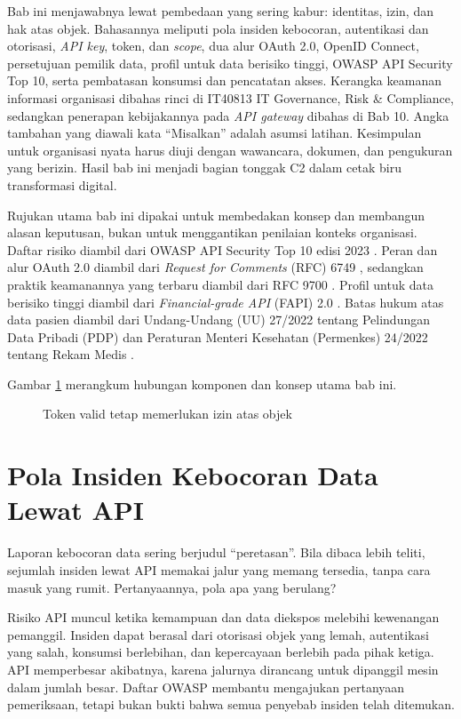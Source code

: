 Bab ini menjawabnya lewat pembedaan yang sering kabur: identitas, izin, dan hak atas objek. Bahasannya meliputi pola
insiden kebocoran, autentikasi dan otorisasi, \textit{API key}, token, dan \textit{scope}, dua alur OAuth 2.0,
OpenID Connect, persetujuan pemilik data, profil untuk data berisiko tinggi, OWASP API Security Top 10, serta
pembatasan konsumsi dan pencatatan akses. Kerangka keamanan informasi organisasi dibahas rinci di IT40813 IT
Governance, Risk \& Compliance, sedangkan penerapan kebijakannya pada \textit{API gateway} dibahas di Bab 10. Angka
tambahan yang diawali kata ``Misalkan'' adalah asumsi latihan. Kesimpulan untuk organisasi nyata harus diuji dengan
wawancara, dokumen, dan pengukuran yang berizin. Hasil bab ini menjadi bagian tonggak C2 dalam cetak biru
transformasi digital.

Rujukan utama bab ini dipakai untuk membedakan konsep dan membangun alasan keputusan, bukan untuk menggantikan
penilaian konteks organisasi. Daftar risiko diambil dari OWASP API Security Top 10 edisi 2023 \cite{owasp-api2023}.
Peran dan alur OAuth 2.0 diambil dari \textit{Request for Comments} (RFC) 6749 \cite{rfc6749}, sedangkan praktik
keamanannya yang terbaru diambil dari RFC 9700 \cite{rfc9700}. Profil untuk data berisiko tinggi diambil dari
\textit{Financial-grade API} (FAPI) 2.0 \cite{fapi2}. Batas hukum atas data pasien diambil dari Undang-Undang (UU)
27/2022 tentang Pelindungan Data Pribadi (PDP) \cite{uu27-2022-pdp} dan Peraturan Menteri Kesehatan (Permenkes)
24/2022 tentang Rekam Medis \cite{permenkes24-2022}.

Gambar \ref{fig:ch06-ilustrasi-bab} merangkum hubungan komponen dan konsep utama bab ini.
\begin{figure}[!htb]
  \centering
  
  \caption{Token valid tetap memerlukan izin atas objek}
  \label{fig:ch06-ilustrasi-bab}
\end{figure}

\section{Pola Insiden Kebocoran Data Lewat API}

Laporan kebocoran data sering berjudul ``peretasan''. Bila dibaca lebih teliti, sejumlah insiden lewat API memakai
jalur yang memang tersedia, tanpa cara masuk yang rumit. Pertanyaannya, pola apa yang berulang?

Risiko API muncul ketika kemampuan dan data diekspos melebihi kewenangan pemanggil. Insiden dapat berasal dari
otorisasi objek yang lemah, autentikasi yang salah, konsumsi berlebihan, dan kepercayaan berlebih pada pihak ketiga.
API memperbesar akibatnya, karena jalurnya dirancang untuk dipanggil mesin dalam jumlah besar. Daftar OWASP membantu
mengajukan pertanyaan pemeriksaan, tetapi bukan bukti bahwa semua penyebab insiden telah ditemukan.

